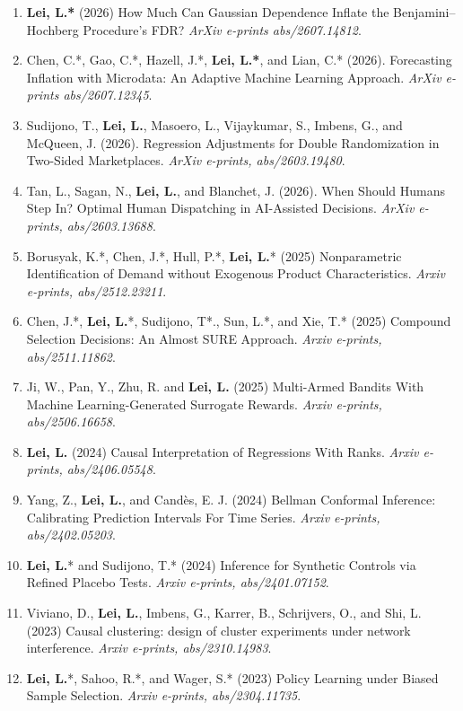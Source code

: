 \documentclass{article}
\begin{document}
\begin{enumerate}
\item \textbf{Lei, L.*} (2026) How Much Can Gaussian Dependence Inflate the Benjamini–Hochberg Procedure’s FDR? \emph{ArXiv e-prints abs/2607.14812}.
\item Chen, C.*, Gao, C.*, Hazell, J.*, \textbf{Lei, L.*}, and Lian, C.* (2026). Forecasting Inflation with Microdata: An Adaptive Machine Learning Approach. \emph{ArXiv e-prints abs/2607.12345}.
\item Sudijono, T., \textbf{Lei, L.}, Masoero, L., Vijaykumar, S., Imbens, G., and McQueen, J. (2026). Regression Adjustments for Double Randomization in Two-Sided Marketplaces. \emph{ArXiv e-prints, abs/2603.19480}.
\item Tan, L., Sagan, N., \textbf{Lei, L.}, and Blanchet, J. (2026). When Should Humans Step In? Optimal Human Dispatching in AI-Assisted Decisions. \emph{ArXiv e-prints, abs/2603.13688}.
\item Borusyak, K.*, Chen, J.*, Hull, P.*, \textbf{Lei, L.}* (2025) Nonparametric Identification of Demand without Exogenous Product Characteristics. \emph{Arxiv e-prints, abs/2512.23211}.
\item Chen, J.*, \textbf{Lei, L.}*, Sudijono, T*., Sun, L.*, and Xie, T.* (2025) Compound Selection Decisions: An Almost SURE Approach. \emph{Arxiv e-prints, abs/2511.11862}.
\item Ji, W., Pan, Y., Zhu, R. and \textbf{Lei, L.} (2025) Multi-Armed Bandits With Machine Learning-Generated Surrogate Rewards. \emph{Arxiv e-prints, abs/2506.16658}.
\item \textbf{Lei, L.} (2024) Causal Interpretation of Regressions With Ranks. \emph{Arxiv e-prints, abs/2406.05548}.
\item Yang, Z., \textbf{Lei, L.}, and Cand\`{e}s, E. J. (2024) Bellman Conformal Inference: Calibrating Prediction Intervals For Time Series. \emph{Arxiv e-prints, abs/2402.05203}.
\item \textbf{Lei, L.}* and Sudijono, T.* (2024) Inference for Synthetic Controls via Refined Placebo Tests. \emph{Arxiv e-prints, abs/2401.07152}.
\item Viviano, D., \textbf{Lei, L.}, Imbens, G., Karrer, B., Schrijvers, O., and Shi, L. (2023) Causal clustering: design of cluster experiments under network interference. \emph{Arxiv e-prints, abs/2310.14983}.
\item \textbf{Lei, L.}*, Sahoo, R.*, and Wager, S.* (2023) Policy Learning under Biased Sample Selection. \emph{Arxiv e-prints, abs/2304.11735}.  

\end{enumerate}
\end{document}
